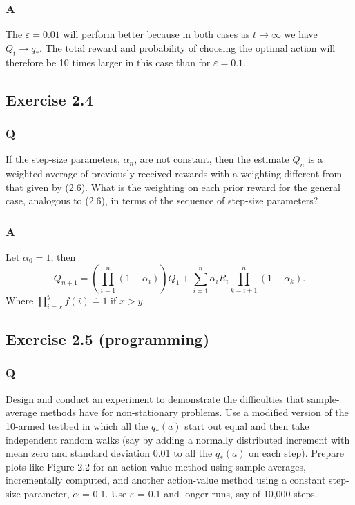 \subsubsection{A}
The $\varepsilon = 0.01$ will perform better because in both cases as $t \to \infty$ we have $Q_t \to q_*$. The total reward and probability of choosing the optimal action will therefore be 10 times larger in this case than for $\varepsilon = 0.1$.


\subsection{Exercise 2.4}
\label{ex:2.4}
\subsubsection{Q}
If the step-size parameters, $\alpha_n$, are not constant, then the estimate $Q_n$ is a weighted average of previously received rewards with a weighting different from that given by (2.6). What is the weighting on each prior reward for the general case, analogous to (2.6), in terms of the sequence of step-size parameters?

\subsubsection{A}
Let $\alpha_0 = 1$, then 
\begin{equation}
    Q_{n + 1} = \left(\prod_{i=1}^n (1 - \alpha_i) \right) Q_1 + \sum_{i = 1}^{n}  \alpha_{i} R_{i} \prod_{k = i + 1}^n
(1 - \alpha_k).
\end{equation}
Where $\prod_{i=x}^y f(i) \doteq 1$ if $x > y$.

\subsection{Exercise 2.5 (programming)}
\subsubsection{Q}
Design and conduct an experiment to demonstrate the difficulties that sample-average methods have for non-stationary problems. Use a modified version of the 10-armed testbed in which all the $q_*(a)$ start out equal and then take independent random walks (say by adding a normally distributed increment with mean zero and standard deviation 0.01 to all the $q_*(a)$ on each step). Prepare plots like Figure 2.2 for an action-value method using sample averages, incrementally computed, and another action-value method using a constant step-size parameter, $\alpha$ = 0.1. Use $\varepsilon$ = 0.1 and longer runs, say of 10,000 steps.

